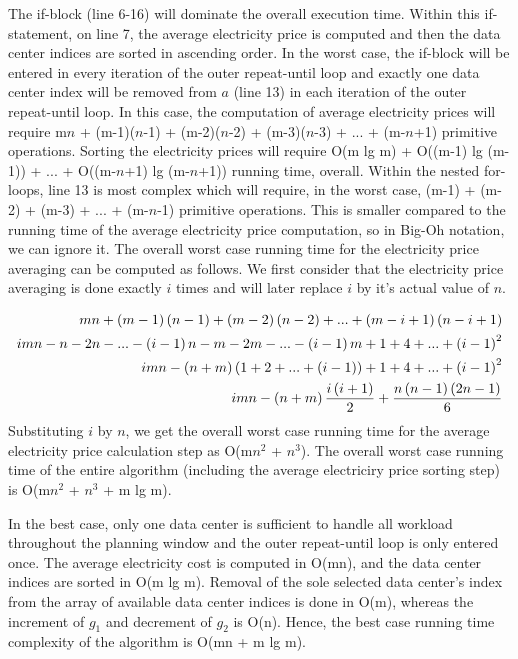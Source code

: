 The if-block (line 6-16) will dominate the overall execution time. Within this if-statement, on line 7, the average electricity price is computed and then the data center indices are sorted in ascending order. In the worst case, the if-block will be entered in every iteration of the outer repeat-until loop and exactly one data center index will be removed from $a$ (line 13) in each iteration of the outer repeat-until loop. In this case, the computation of average electricity prices will require m$n$ + (m-1)($n$-1) + (m-2)($n$-2) + (m-3)($n$-3) + ... + (m-$n$+1) primitive operations. Sorting the electricity prices will require O(m lg m) + O((m-1) lg (m-1)) +  ... + O((m-$n$+1) lg (m-$n$+1)) running time, overall. Within the nested for-loops, line 13 is most complex which will require, in the worst case, (m-1) + (m-2) + (m-3) + ... + (m-$n$-1) primitive operations. This is smaller compared to the running time of the average electricity price computation, so in Big-Oh notation, we can ignore it. The overall worst case running time for the electricity price averaging can be computed as follows. We first consider that the electricity price averaging is done exactly $i$ times and will later replace $i$ by it's actual value of $n$.

\begin{align}
mn + \left(m-1\right) \left(n-1\right) + \left(m-2\right) \left(n-2\right) + ... + \left(m-i+1\right) \left(n-i+1\right)\notag \\
i mn - n - 2n - ... - \left(i-1\right)n - m - 2m - ... - \left(i-1\right)m + 1 + 4 + ... + \left(i-1\right)^2\notag \\
i m n - \left(n + m\right)\left(1 + 2 + ... + \left(i-1\right)\right) + 1 + 4 + ... + \left(i-1\right)^2\notag \\
i mn - \left(n + m\right)\frac{i\left(i+1\right)}{2} + \frac{n\left(n-1\right)\left(2n-1\right)}{6}\notag
\end{align}
Substituting $i$ by $n$, we get the overall worst case running time for the average electricity price calculation step as O(m$n^2$ + $n^3$). The overall worst case running time of the entire algorithm (including the average electriciry price sorting step) is O(m$n^2$ + $n^3$ + m lg m).

In the best case, only one data center is sufficient to handle all workload throughout the planning window and the outer repeat-until loop is only entered once. The average electricity cost is computed in O(mn), and the data center indices are sorted in O(m lg m). Removal of the sole selected data center's index from the array of available data center indices is done in O(m), whereas the increment of $g_1$ and decrement of $g_2$ is O(n). Hence, the best case running time complexity of the algorithm is O(mn + m lg m).

